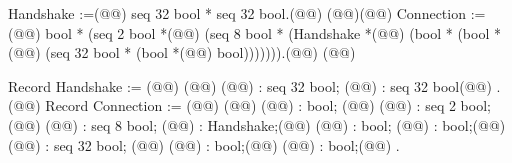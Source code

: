 Handshake :=(@\vspace{-0.04cm}@)
  seq 32 bool * seq 32 bool.(@\vspace{-0.04cm}@)
(@@)(@\vspace{-0.04cm}@)
Connection :=(@\vspace{-0.04cm}@)
  bool * (seq 2 bool *(@\vspace{-0.04cm}@)
 (seq 8 bool * (Handshake *(@\vspace{-0.04cm}@)
 (bool * (bool *(@\vspace{-0.04cm}@)
 (seq 32 bool * (bool *(@\vspace{-0.04cm}@)
  bool))))))).(@\vspace{-0.04cm}@)
(@@)

Record Handshake := (@@) {(@\vspace{-0.04cm}@)
  (@@) : seq 32 bool; (@@) : seq 32 bool(@\vspace{-0.04cm}@)
}.(@\vspace{-0.04cm}@)
Record Connection := (@@) {(@\vspace{-0.04cm}@)
  (@@) : bool;  (@\hspace{0.04cm}@)  (@@) : seq 2 bool;(@\vspace{-0.04cm}@)
  (@@) : seq 8 bool;     (@@) : Handshake;(@\vspace{-0.04cm}@)
  (@@) : bool; (@@) : bool;(@\vspace{-0.04cm}@)
  (@@) : seq 32 bool;      (@\hspace{0.03cm}@)  (@@) : bool;(@\vspace{-0.04cm}@)
  (@@) : bool;(@\vspace{-0.04cm}@)
}.

